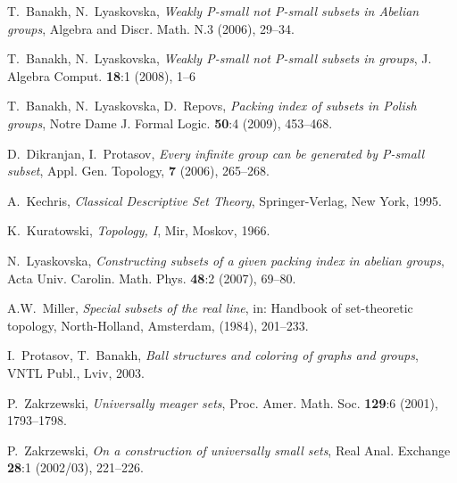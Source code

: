 \documentclass[11pt]{amsart}
\begin{document}
\begin{thebibliography}{}

 T.~Banakh, N.~Lyaskovska, {\em Weakly P-small not P-small subsets in Abelian groups}, Algebra and Discr. Math. N.3 (2006), 29--34.

 T.~Banakh, N.~Lyaskovska, {\em Weakly P-small not P-small subsets in groups}, J. Algebra Comput. {\bf 18}:1 (2008), 1--6

 T.~Banakh, N.~Lyaskovska, D.~Repovs, {\em Packing index of subsets in Polish groups}, Notre Dame J. Formal Logic. {\bf 50}:4 (2009), 453--468.

 D.~Dikranjan,  I.~Protasov, {\em Every infinite group can be generated by P-small subset}, Appl. Gen. Topology, {\bf 7} (2006), 265--268.

 A.~Kechris, {\em Classical Descriptive Set Theory}, Springer-Verlag, New York, 1995.

 K.~Kuratowski, {\em Topology, I}, Mir, Moskov, 1966.

 N.~Lyaskovska, {\em Constructing subsets of a given packing index in abelian groups}, Acta Univ. Carolin. Math. Phys. {\bf 48}:2 (2007), 69--80.

  A.W.~Miller, {\em Special subsets of the real line}, in: Handbook of set-theoretic topology, North-Holland, Amsterdam, (1984), 201--233.

 I.~Protasov, T.~Banakh, {\em Ball structures and coloring of graphs and groups},
VNTL Publ., Lviv, 2003.

 P.~Zakrzewski, {\em Universally meager sets}, Proc. Amer. Math. Soc. {\bf 129}:6 (2001), 1793--1798.

 P.~Zakrzewski, {\em On a construction of universally small sets}, Real Anal. Exchange {\bf 28}:1 (2002/03), 221--226.

\end{thebibliography}
\end{document}
